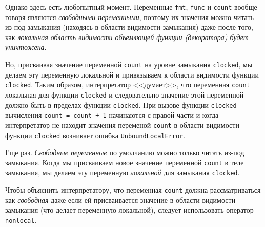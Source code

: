 \documentclass[%
	11pt,
	a4paper,
	utf8,
		]{article}
\begin{document}

Однако здесь есть любопытный момент. Переменные \texttt{fmt}, \texttt{func} и \texttt{count} вообще говоря являются \emph{свободными переменными}, поэтому их значения можно читать из-под замыкания (находясь в области видимости замыкания) даже после того, как \emph{локальная область видимости объемлющей функции (декоратора) будет уничтожена}.

Но, присваивая значение переменной \texttt{count} на уровне замыкания \texttt{clocked}, мы делаем эту переменную локальной и привязываем к области видимости функции \texttt{clocked}. Таким образом, интерпретатор <<думает>>, что переменная \texttt{count} локальная для функции \texttt{clocked} и следовательно значение этой переменной должно быть в пределах функции \texttt{clocked}. При вызове функции \texttt{clocked} вычисления \texttt{count = count + 1} начинаются с правой части и когда интерпретатор не находит значения переменой \texttt{count} в области видимости функции \texttt{clocked} возникает ошибка \texttt{UnboundLocalError}.


Еще раз. \emph{Свободные переменные} по умолчанию можно \underline{только читать} из-под замыкания. Когда мы присваиваем новое значение переменной \texttt{count} в теле замыкания, мы делаем эту переменную \emph{локальной} для замыкания \texttt{clocked}.

Чтобы объяснить интерпретатору, что переменная \texttt{count} должна рассматриваться как \emph{свободная} даже если ей присваивается значение в области видимости замыкания (что делает переменную локальной), следует использовать оператор \texttt{nonlocal}.

\end{document}
